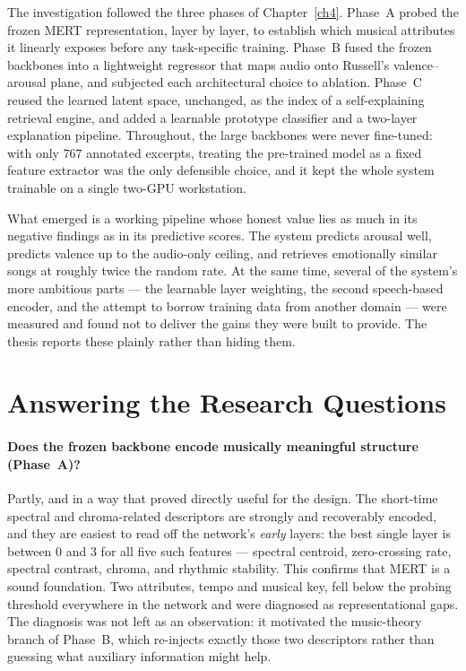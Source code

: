 \documentclass[12pt]{report}
\begin{document}
The investigation followed the three phases of Chapter~\ref{ch4}. Phase~A probed the frozen MERT representation, layer by layer, to establish which musical attributes it linearly exposes before any task-specific training. Phase~B fused the frozen backbones into a lightweight regressor that maps audio onto Russell's valence--arousal plane, and subjected each architectural choice to ablation. Phase~C reused the learned latent space, unchanged, as the index of a self-explaining retrieval engine, and added a learnable prototype classifier and a two-layer explanation pipeline. Throughout, the large backbones were never fine-tuned: with only $767$ annotated excerpts, treating the pre-trained model as a fixed feature extractor was the only defensible choice, and it kept the whole system trainable on a single two-GPU workstation.

What emerged is a working pipeline whose honest value lies as much in its negative findings as in its predictive scores. The system predicts arousal well, predicts valence up to the audio-only ceiling, and retrieves emotionally similar songs at roughly twice the random rate. At the same time, several of the system's more ambitious parts --- the learnable layer weighting, the second speech-based encoder, and the attempt to borrow training data from another domain --- were measured and found not to deliver the gains they were built to provide. The thesis reports these plainly rather than hiding them.

\section{Answering the Research Questions}
\label{sec:conclusions-rqs}

\paragraph{Does the frozen backbone encode musically meaningful structure (Phase~A)?}
Partly, and in a way that proved directly useful for the design. The short-time spectral and chroma-related descriptors are strongly and recoverably encoded, and they are easiest to read off the network's \emph{early} layers: the best single layer is between $0$ and $3$ for all five such features --- spectral centroid, zero-crossing rate, spectral contrast, chroma, and rhythmic stability. This confirms that MERT is a sound foundation. Two attributes, tempo and musical key, fell below the probing threshold everywhere in the network and were diagnosed as representational gaps. The diagnosis was not left as an observation: it motivated the music-theory branch of Phase~B, which re-injects exactly those two descriptors rather than guessing what auxiliary information might help.
\end{document}
